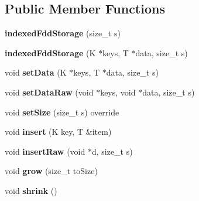 \subsection*{Public Member Functions}
\begin{DoxyCompactItemize}
\item 
\hypertarget{classfaster_1_1indexedFddStorage_ae23d28156db0adaf7ce85d59f3de83b8}{}{\bfseries indexed\+Fdd\+Storage} (size\+\_\+t s)\label{classfaster_1_1indexedFddStorage_ae23d28156db0adaf7ce85d59f3de83b8}

\item 
\hypertarget{classfaster_1_1indexedFddStorage_a0d632c3336dc752458bb9262c67f4c9a}{}{\bfseries indexed\+Fdd\+Storage} (K $\ast$keys, T $\ast$data, size\+\_\+t s)\label{classfaster_1_1indexedFddStorage_a0d632c3336dc752458bb9262c67f4c9a}

\item 
\hypertarget{classfaster_1_1indexedFddStorage_ae7c5b6ad85c386d8cffd904cb572d488}{}void {\bfseries set\+Data} (K $\ast$keys, T $\ast$data, size\+\_\+t s)\label{classfaster_1_1indexedFddStorage_ae7c5b6ad85c386d8cffd904cb572d488}

\item 
\hypertarget{classfaster_1_1indexedFddStorage_a9da343629ac1b2c725e4683177a3278b}{}void {\bfseries set\+Data\+Raw} (void $\ast$keys, void $\ast$data, size\+\_\+t s)\label{classfaster_1_1indexedFddStorage_a9da343629ac1b2c725e4683177a3278b}

\item 
\hypertarget{classfaster_1_1indexedFddStorage_a80f2ff6bb9c7b5a5cc04f22e4395596d}{}void {\bfseries set\+Size} (size\+\_\+t s) override\label{classfaster_1_1indexedFddStorage_a80f2ff6bb9c7b5a5cc04f22e4395596d}

\item 
\hypertarget{classfaster_1_1indexedFddStorage_a0a9fc58cdf64a108b43c1e4ec2d3a557}{}void {\bfseries insert} (K key, T \&item)\label{classfaster_1_1indexedFddStorage_a0a9fc58cdf64a108b43c1e4ec2d3a557}

\item 
\hypertarget{classfaster_1_1indexedFddStorage_a4e5ac4c4f6d1e32f5949361a54a29453}{}void {\bfseries insert\+Raw} (void $\ast$d, size\+\_\+t s)\label{classfaster_1_1indexedFddStorage_a4e5ac4c4f6d1e32f5949361a54a29453}

\item 
\hypertarget{classfaster_1_1indexedFddStorage_ad4430e7b86d905f3df6a10ee72d9de3d}{}void {\bfseries grow} (size\+\_\+t to\+Size)\label{classfaster_1_1indexedFddStorage_ad4430e7b86d905f3df6a10ee72d9de3d}

\item 
\hypertarget{classfaster_1_1indexedFddStorage_a8c235374da0dc7291a062abf2dd0b390}{}void {\bfseries shrink} ()\label{classfaster_1_1indexedFddStorage_a8c235374da0dc7291a062abf2dd0b390}

\end{DoxyCompactItemize}
